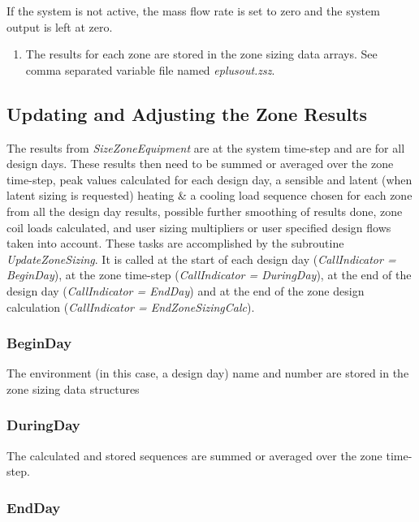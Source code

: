 If the system is not active, the mass flow rate is set to zero and the system output is left at zero.

\begin{enumerate}
\def\labelenumi{\arabic{enumi})}
\setcounter{enumi}{2}
\tightlist
\item
  The results for each zone are stored in the zone sizing data arrays. See comma separated variable file named \emph{eplusout.zsz}.
\end{enumerate}

\subsection{Updating and Adjusting the Zone Results}\label{updating-and-adjusting-the-zone-results}

The results from \emph{SizeZoneEquipment} are at the system time-step and are for all design days. These results then need to be summed or averaged over the zone time-step, peak values calculated for each design day, a sensible and latent (when latent sizing is requested) heating \& a cooling load sequence chosen for each zone from all the design day results, possible further smoothing of results done, zone coil loads calculated, and user sizing multipliers or user specified design flows taken into account. These tasks are accomplished by the subroutine \emph{UpdateZoneSizing}. It is called at the start of each design day (\emph{CallIndicator = BeginDay}), at the zone time-step (\emph{CallIndicator = DuringDay}), at the end of the design day (\emph{CallIndicator = EndDay}) and at the end of the zone design calculation (\emph{CallIndicator = EndZoneSizingCalc}).

\subsubsection{BeginDay}\label{beginday-000}

The environment (in this case, a design day) name and number are stored in the zone sizing data structures

\subsubsection{DuringDay}\label{duringday-000}

The calculated and stored sequences are summed or averaged over the zone time-step.

\subsubsection{EndDay}\label{endday-000}

